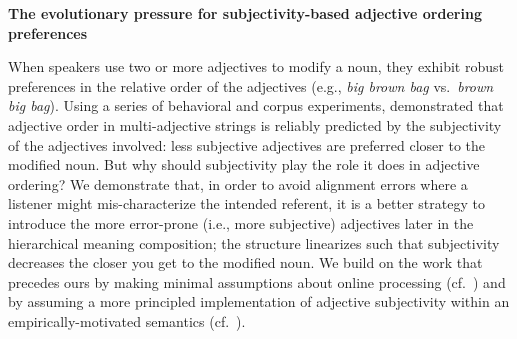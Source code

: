\documentclass[12pt]{article}
\begin{document}
\setlength{\abovedisplayskip}{0.5pt}
\setlength{\belowdisplayskip}{0.5pt}


\begin{center}
	\textbf{The evolutionary pressure for subjectivity-based adjective ordering preferences}
\end{center}

\vspace{-9pt}

\noindent 
When speakers use two or more adjectives to modify a noun, they exhibit robust preferences in the relative order of the adjectives (e.g., \emph{big brown bag} vs.~\emph{brown big bag}). Using a series of behavioral and corpus experiments,  demonstrated that adjective order in multi-adjective strings is reliably predicted by the subjectivity of the adjectives involved: less subjective adjectives are preferred closer to the modified noun. But why should subjectivity play the role it does in adjective ordering? 
We demonstrate that, in order to avoid alignment errors where a listener might mis-characterize the intended referent, it is a better strategy to introduce the more error-prone (i.e., more subjective) adjectives later in the hierarchical meaning composition; the structure linearizes such that subjectivity decreases the closer you get to the modified noun. We build on the work that precedes ours by making minimal assumptions about online processing (cf.~) and by assuming a more principled implementation of adjective subjectivity within an empirically-motivated semantics (cf.~).
\end{document}

